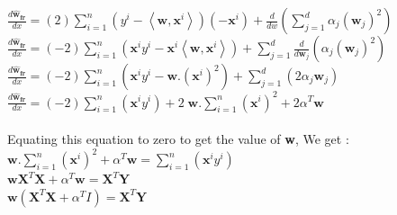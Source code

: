 \documentclass[a4paper,11pt]{article}
\begin{document}
\begin{mlsolution}
\begin{math}
\frac{ d\widehat{\textbf{w}}_{\textbf{fr}} }{dx} = \left ( 2 \right ) \sum_{i = 1}^{n}\left ( y^{i} - \left \langle \textbf{w}, \textbf{x}^{i} \right \rangle \right )\left ( - \textbf{x}^{i} \right ) + \frac{d}{dw} (\sum_{j = 1}^{d} \alpha_{j}\left ( \textbf{w}_{j} \right )^{2})
\end{math}\\

\begin{math}
\frac{ d\widehat{\textbf{w}}_{\textbf{fr}} }{dx} = \left ( -2 \right ) \sum_{i = 1}^{n}\left ( \textbf{x}^{i}y^{i} - \textbf{x}^{i}\left \langle \textbf{w}, \textbf{x}^{i} \right \rangle \right  ) + \sum_{j = 1}^{d} \frac{d}{d\textbf{w}_{j}} (\alpha_{j}\left ( \textbf{w}_{j} \right )^{2})
\end{math}\\

\begin{math}
\frac{ d\widehat{\textbf{w}}_{\textbf{fr}} }{dx} = \left ( -2 \right ) \sum_{i = 1}^{n}\left ( \textbf{x}^{i}y^{i} - \textbf{w}. (\textbf{x}^{i})^{2} \right  ) + \sum_{j = 1}^{d} (2\alpha_{j}\textbf{w}_{j})
\end{math}\\

\begin{math}
\frac{ d\widehat{\textbf{w}}_{\textbf{fr}} }{dx} = \left ( -2 \right ) \sum_{i = 1}^{n}\left ( \textbf{x}^{i}y^{i} \right  )  + 2 \; \textbf{w}.\sum_{i=1}^{n} (\textbf{x}^{i})^{2} + 2 \alpha^{T}\textbf{w}
\end{math}\\\\ Equating this equation to zero to get the value of \textbf{w}, We get :\\

\begin{math}
\textbf{w}.\sum_{i=1}^{n} (\textbf{x}^{i})^{2} + \alpha^{T}\textbf{w} = \sum_{i = 1}^{n}\left ( \textbf{x}^{i}y^{i} \right  ) 
\end{math}\\

\begin{math}
\textbf{w}\textbf{X}^{T}\textbf{X} + \alpha^{T}\textbf{w} = \textbf{X}^{T}\textbf{Y}
\end{math}\\

\begin{math}
\textbf{w}\left ( \textbf{X}^{T}\textbf{X} + \alpha^{T}I \right ) = \textbf{X}^{T}\textbf{Y}\end{math}\\


\end{mlsolution}
\end{document}
